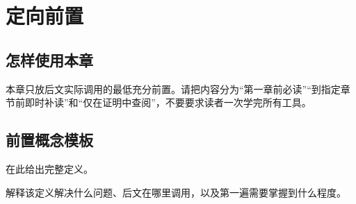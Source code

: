 \chapter{定向前置}
\label{ch:prerequisites}

\section{怎样使用本章}
\label{sec:ch00-how-to-use}

本章只放后文实际调用的最低充分前置。请把内容分为“第一章前必读”“到指定章节前即时补读”和“仅在证明中查阅”，不要要求读者一次学完所有工具。

\section{前置概念模板}
\label{sec:ch00-concept}

\begin{definition}
在此给出完整定义。
\end{definition}

\begin{note}
解释该定义解决什么问题、后文在哪里调用，以及第一遍需要掌握到什么程度。
\end{note}


